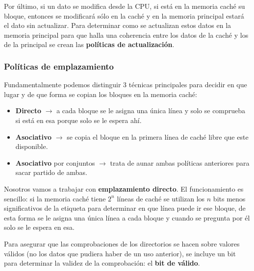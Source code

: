 \documentclass[a4paper,10pt]{book}
\begin{document}
Por último, si un dato se modifica desde la CPU, si está en la memoria caché su bloque, entonces se modificará sólo en la caché y en la memoria principal estará el dato sin actualizar. Para determinar como se actualizan estos datos en la memoria principal para que halla una coherencia entre los datos de la caché y los de la principal se crean las \textbf{políticas de actualización}.

\subsubsection*{Políticas de emplazamiento}
Fundamentalmente podemos distinguir 3 técnicas principales para decidir en que lugar y de que forma se copian los bloques en la memoria caché:
\begin{itemize}
\item \textbf{Directo} $\rightarrow$ a cada bloque se le asigna una única línea y solo se comprueba si está en esa porque solo se le espera ahí.
\item \textbf{Asociativo} $\rightarrow$ se copia el bloque en la primera línea de caché libre que este disponible.
\item \textbf{Asociativo} por conjuntos $\rightarrow$ trata de aunar ambas políticas anteriores para sacar partido de ambas.
\end{itemize}
Nosotros vamos a trabajar con \textbf{emplazamiento directo}. El funcionamiento es sencillo: si la memoria caché tiene $2^n$ líneas de caché se utilizan los $n$ bits menos significativos de la etiqueta para determinar en que línea puede ir ese bloque, de esta forma se le asigna una única línea a cada bloque y cuando se pregunta por él solo se le espera en esa.

Para asegurar que las comprobaciones de los directorios se hacen sobre valores válidos (no los datos que pudiera haber de un uso anterior), se incluye un bit para determinar la validez de la comprobación: el \textbf{bit de válido}.
\end{document}
